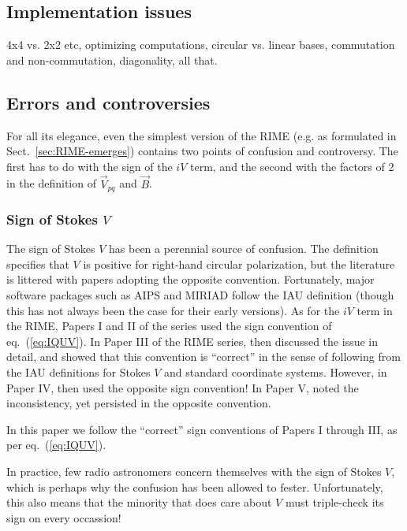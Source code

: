 \documentclass[]{aa}
\begin{document}
\subsection{Implementation issues}

4x4 vs. 2x2 etc, optimizing computations, circular vs. linear bases, commutation and non-commutation, diagonality, all that.

\subsection{Errors and controversies}

For all its elegance, even the simplest version of the RIME (e.g. as formulated in Sect.~\ref{sec:RIME-emerges}) contains two points of confusion and controversy. The first has to do with the sign of the $iV$ term, and the second with the factors of 2 in the definition of $\vec V_{pq}$ and $\vec B$.

\subsubsection{Sign of Stokes $V$}

The sign of Stokes $V$ has been a perennial source of confusion. The \citet{IAU74} definition specifies that $V$ is positive for right-hand circular polarization, but the literature is littered with papers adopting the opposite convention. Fortunately, major software packages such as AIPS and MIRIAD follow the IAU definition (though this 
has not always been the case for their early versions). As for the $iV$ term in the RIME, Papers I and II of the series \citep{ME1,ME2} used the sign convention of eq.~(\ref{eq:IQUV}). In Paper III of the RIME series, \citet{ME3} then discussed the issue in detail, and showed that this convention is ``correct'' in the sense of following from the IAU definitions for Stokes $V$ and standard coordinate systems. However, in Paper IV, \citet{ME4} then used the opposite sign convention! In Paper V, \citet{ME5} noted the inconsistency, yet persisted in the opposite convention. 

In this paper we follow the ``correct'' sign conventions of Papers I through III, as per eq.~(\ref{eq:IQUV}).

In practice, few radio astronomers concern themselves with the sign of Stokes $V$, which is perhaps why the confusion has been allowed to fester. Unfortunately, this also means that the minority that does care about $V$ must triple-check its sign on every occassion!
\end{document}

